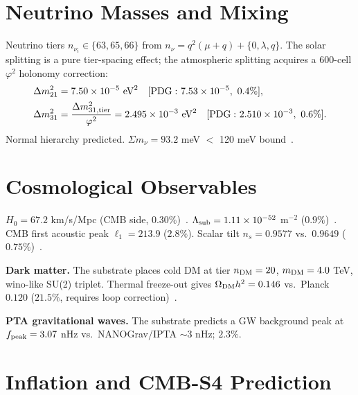 \documentclass[aps,prl,twocolumn,superscriptaddress,nofootinbib]{revtex4-2}
\begin{document}
\section{Neutrino Masses and Mixing}

Neutrino tiers $n_{\nu_i}\in\{63,65,66\}$
from $n_\nu=q^2(\mu+q)+\{0,\lambda,q\}$.
The solar splitting is a pure tier-spacing effect;
the atmospheric splitting acquires a 600-cell $\varphi^2$ holonomy correction:
\begin{align}
\Delta m^2_{21} &= 7.50\times10^{-5}\ {\rm eV}^2\quad [{\rm PDG:}\ 7.53\times10^{-5},\ 0.4\%], \\
\Delta m^2_{31} &= \frac{\Delta m^2_{31,{\rm tier}}}{\varphi^2}
  = 2.495\times10^{-3}\ {\rm eV}^2\quad [{\rm PDG:}\ 2.510\times10^{-3},\ 0.6\%].
\end{align}
Normal hierarchy predicted. $\Sigma m_\nu = 93.2$ meV $<$ 120 meV bound~\cite{PDG2024}.

\section{Cosmological Observables}

$H_0=67.2$ km/s/Mpc (CMB side, $0.30\%$)~\cite{DESI2024}.
$\Lambda_{\rm sub}=1.11\times10^{-52}$ m$^{-2}$ ($0.9\%$)~\cite{Planck2020}.
CMB first acoustic peak $\ell_1=213.9$ ($2.8\%$).
Scalar tilt $n_s=0.9577$ vs.\ $0.9649$ ($0.75\%$)~\cite{Planck2020}.

\textbf{Dark matter.}
The substrate places cold DM at tier $n_{\rm DM}=20$,
$m_{\rm DM}=4.0$ TeV, wino-like SU(2) triplet.
Thermal freeze-out gives
$\Omega_{\rm DM}h^2=0.146$ vs.\ Planck $0.120$ ($21.5\%$,
requires loop correction)~\cite{Planck2020}.

\textbf{PTA gravitational waves.}
The substrate predicts a GW background peak at
$f_{\rm peak}=3.07$ nHz vs.\ NANOGrav/IPTA $\sim3$ nHz; $2.3\%$.

\section{Inflation and CMB-S4 Prediction}
\end{document}
